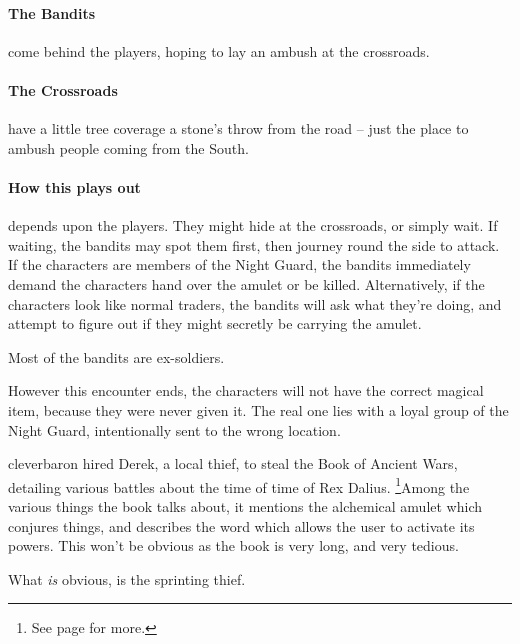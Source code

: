 \begin{multicols}{2}
\humansoldier

\paragraph{The Bandits} come behind the players, hoping to lay an ambush at the crossroads.

\paragraph{The Crossroads} have a little tree coverage a stone's throw from the road -- just the place to ambush people coming from the South.

\paragraph{How this plays out} depends upon the players.  They might hide at the crossroads, or simply wait.  If waiting, the bandits may spot them first, then journey round the side to attack.  If the characters are members of the Night Guard, the bandits immediately demand the characters hand over the amulet or be killed.  Alternatively, if the characters look like normal traders, the bandits will ask what they're doing, and attempt to figure out if they might secretly be carrying the amulet.


Most of the bandits are ex-soldiers.

\humansoldier

However this encounter ends, the characters will not have the correct magical item, because they were never given it.  The real one lies with a loyal group of the Night Guard, intentionally sent to the wrong location.

\vfill\null


\Gls{cleverbaron} hired Derek, a local thief, to steal the Book of Ancient Wars, detailing various battles about the time of time of Rex Dalius.
\footnote{See page \pageref{h_dalius} for more.}Among the various things the book talks about, it mentions the alchemical amulet which conjures things, and describes the word which allows the user to activate its powers.
This won't be obvious as the book is very long, and very tedious.

What \emph{is} obvious, is the sprinting thief.

\begin{boxtext}


\end{boxtext}
\end{multicols}
